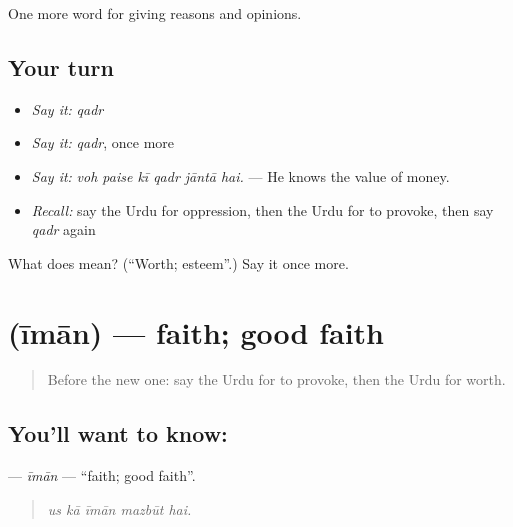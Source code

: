 \begin{grammarlens}[title={What you've built}]
One more word for giving reasons and opinions.
\end{grammarlens}

\subsection*{Your turn}
\begin{itemize}
\raggedright
  \item \emph{Say it:} \emph{qadr}
  \item \emph{Say it:} \emph{qadr}, once more
  \item \emph{Say it:} \emph{voh paise kī qadr jāntā hai.} — He knows the value of money.
  \item \emph{Recall:} say the Urdu for oppression, then the Urdu for to provoke, then say \emph{qadr} again
\end{itemize}

\begin{tcolorbox}[breakable,colback=teal!4,colframe=teal!35!black,title={Before you move on}]
What does  mean? (\textquotedblleft{}Worth; esteem\textquotedblright{}.) Say it once more.
\end{tcolorbox}
\section[\texorpdfstring{\ur{ایمان} (īmān)}{ایمان (īmān)}]{ (īmān) — faith; good faith}

\label{lesson:UR-C345-iman}



\begin{quote}
Before the new one: say the Urdu for to provoke, then the Urdu for worth.
\end{quote}

\subsection*{You'll want to know: }
\textbf{} — \emph{īmān} — \textquotedblleft{}faith; good faith\textquotedblright{}.

\begin{quote}
    
\end{quote}

\begin{quote}
\emph{us kā īmān mazbūt hai.}
\end{quote}

